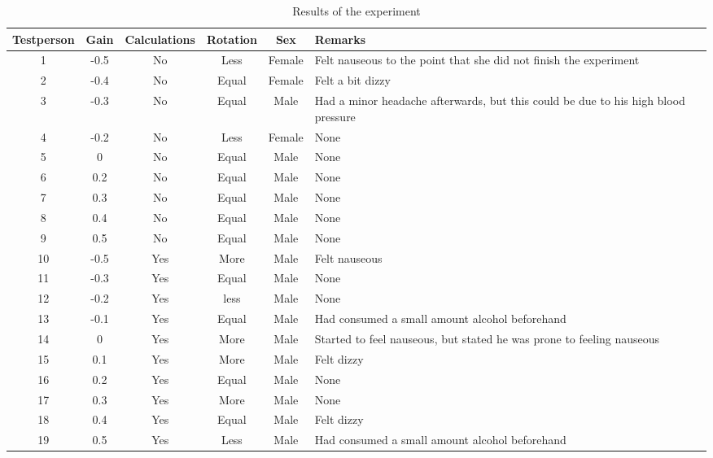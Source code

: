 \newpage
\begin{table}
\begin{center}
\begin{tabular}{|c|c|c|c|c|p{4.5cm}|}
\hline
\textbf{Testperson}	&	\textbf{Gain}	&	\textbf{Calculations}	&	\textbf{Rotation}	&	\textbf{Sex}	&	\textbf{Remarks}\\
\hline
1	&	-0.5	&	No	&	Less	&	Female	&	Felt nauseous to the point that she did not finish the experiment\\ \hline
2	&	-0.4	&	No	&	Equal	&	Female	&	Felt a bit dizzy\\ \hline
3	&	-0.3	&	No	&	Equal	&	Male	&	Had a minor headache afterwards, but this could be due to his high blood pressure\\ \hline
4	&	-0.2	&	No	&	Less	&	Female	&	None\\ \hline
5	&	0	&	No	&	Equal	&	Male	&	None\\ \hline
6	&	0.2	&	No	&	Equal	&	Male	&	None\\ \hline
7	&	0.3	&	No	&	Equal	&	Male	&	None\\ \hline
8	&	0.4	&	No	&	Equal	&	Male	&	None\\ \hline
9	&	0.5	&	No	&	Equal	&	Male	&	None\\ \hline
10	&	-0.5	&	Yes	&	More	&	Male	&	Felt nauseous\\ \hline
11	&	-0.3	&	Yes	&	Equal	&	Male	&	None\\ \hline
12	&	-0.2	&	Yes	&	less	&	Male	&	None\\ \hline
13	&	-0.1	&	Yes	&	Equal	&	Male	&	Had consumed a small amount alcohol beforehand\\ \hline
14	&	0	&	Yes	&	More	&	Male	&	Started to feel nauseous, but stated he was prone to feeling nauseous\\ \hline
15	&	0.1	&	Yes	&	More	&	Male	&	Felt dizzy\\ \hline
16	&	0.2	&	Yes	&	Equal	&	Male	&	None\\ \hline
17	&	0.3	&	Yes	&	More	&	Male	&	None\\ \hline
18	&	0.4	&	Yes	&	Equal	&	Male	&	Felt dizzy\\ \hline
19	&	0.5	&	Yes	&	Less	&	Male	&	Had consumed a small amount alcohol beforehand\\ \hline
\end{tabular}
\label{table:results}
\caption{Results of the experiment}
\end{center}
\end{table}
